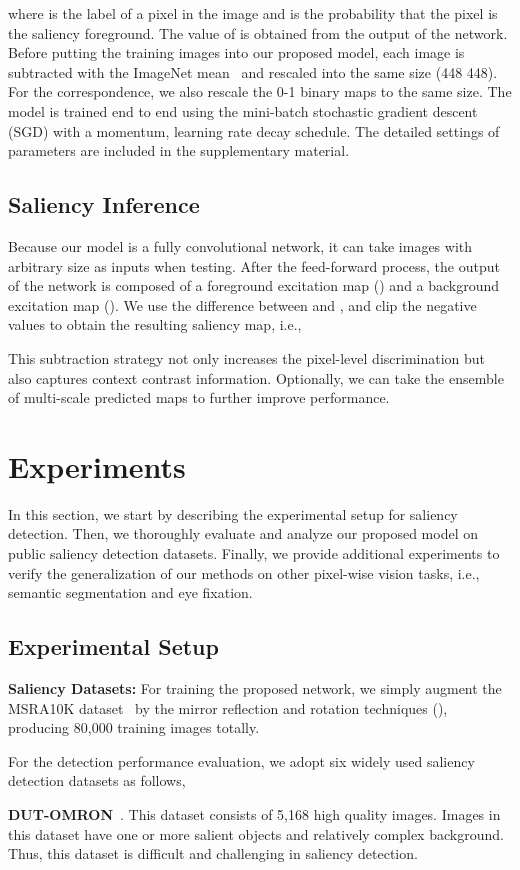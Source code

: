 \documentclass[10pt,twocolumn,letterpaper]{article}
\begin{document}
where   is the label of a pixel  in the image and  is the probability that the pixel is the saliency foreground.
The value of  is obtained from the output of the network.
Before putting the training images into our proposed model, each image is subtracted with the ImageNet mean~\cite{imagenet_cvpr09} and rescaled into the same size (448  448).
For the correspondence, we also rescale the 0-1 binary maps to the same size.
The model is trained end to end using the mini-batch stochastic gradient descent (SGD) with a momentum, learning rate decay schedule.
The detailed settings of parameters are included in the supplementary material.
\subsection{Saliency Inference}
Because our model is a fully convolutional network, it can take images with arbitrary size as inputs when testing.
After the feed-forward process, the output of the network is composed of a foreground excitation map () and a background excitation map ().
We use the difference between  and , and clip the negative values to obtain the resulting saliency map, i.e.,

This subtraction strategy not only increases the pixel-level discrimination but also captures context contrast information.
Optionally, we can take the ensemble of multi-scale predicted maps to further improve performance.
\section{Experiments}
In this section, we start by describing the experimental setup for saliency detection.
Then, we thoroughly evaluate and analyze our proposed model on public saliency detection datasets.
Finally, we provide additional experiments to verify the generalization of our methods on other pixel-wise vision tasks, i.e., semantic segmentation and eye fixation.
\subsection{Experimental Setup}
\textbf{Saliency Datasets:} For training the proposed network, we simply augment the MSRA10K dataset~\cite{ChengPAMI} by the mirror reflection and rotation techniques (), producing 80,000 training images totally. 

For the detection performance evaluation, we adopt six widely used saliency detection datasets as follows,

\textbf{DUT-OMRON}~\cite{yang2013saliency}. This dataset consists of 5,168 high quality images. Images in this dataset have one or more salient objects and relatively complex background. Thus, this dataset is difficult and challenging in saliency detection.
\end{document}
